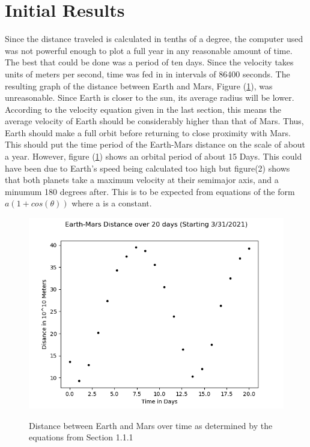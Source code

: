 
%
\section{Initial Results}
Since the distance traveled is calculated in tenths of a degree, the computer used was not powerful enough to plot
a full year in any reasonable amount of time. The best that could be done was a period of ten days. Since the velocity
takes units of meters per second, time was fed in in intervals of 86400 seconds. The resulting graph of the distance
between Earth and Mars, Figure (\ref{DiffPlot}), was unreasonable. Since Earth is closer to the sun, its average radius
will be lower. According to the velocity equation given in the last section, this means the average velocity of Earth 
should be considerably higher than that of Mars. Thus, Earth should make a full orbit before returning to close
proximity with Mars. This should put the time period of the Earth-Mars distance on the scale of about a year.
However, figure (\ref{DiffPlot}) shows an orbital period of about 15 Days. This could have been due to Earth's speed 
being calculated too high but figure(2) shows that both planets take a maximum velocity at their 
semimajor axis, and a minumum 180 degrees after. This is to be expected from equations of the form $a(1+cos(\theta))$ where a is a constant. 
\begin{figure}
	\includegraphics[scale = 0.8]{DistancePlot.png}
	\label{DiffPlot}
	\caption{Distance between Earth and Mars over time as determined by the equations from Section 1.1.1}
\end{figure}

